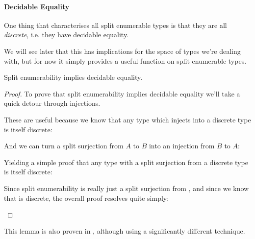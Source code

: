 \paragraph{Decidable Equality}
One thing that characterises all split enumerable types is that they are all
\emph{discrete}, i.e. they have decidable equality. 
\begin{agdalisting*}
  \begin{multicols}{2} \null \vfill
     \vfill \null \columnbreak
  \end{multicols}
\end{agdalisting*}
We will see later that this has implications for the space of types we're
dealing with, but for now it simply provides a useful function on split
enumerable types.
\begin{lemma}\label{split-enum-discrete}
  Split enumerability implies decidable equality.
\end{lemma}
\begin{proof}
To prove that split enumerability implies decidable equality we'll take a quick
detour through injections.
\begin{agdalisting*}
  \begin{multicols}{2}
     \columnbreak
  \end{multicols}
\end{agdalisting*}
These are useful because we know that any type which injects into a discrete
type is itself discrete:
\begin{agdalisting*}
\end{agdalisting*}
And we can turn a split surjection from \(A\) to \(B\) into an injection from
\(B\) to \(A\):
\begin{agdalisting*}
\end{agdalisting*}
Yielding a simple proof that any type with a split surjection from a discrete
type is itself discrete:
\begin{agdalisting*}
\end{agdalisting*}
Since split enumerability is really just a split surjection from
, and since we know that  is discrete, the
overall proof resolves quite simply:
\begin{agdalisting*}
\end{agdalisting*}
\end{proof}
This lemma is also proven in \citet{firsovDependentlyTypedProgramming2015},
although using a significantly different technique.
